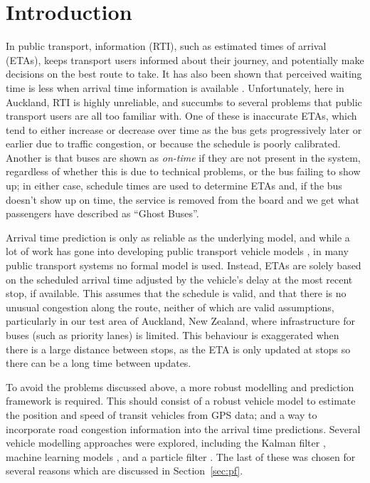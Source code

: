 \section{Introduction}
\label{sec:intro}



In public transport, \rt information (RTI), such as estimated times of arrival (ETAs),
keeps transport users informed about their journey,
and potentially make decisions on the best route to take.
It has also been shown that perceived waiting time is less
when arrival time information is available \citep{TCRP_2003b}.
Unfortunately, here in Auckland, RTI is highly unreliable,
and succumbs to several problems that public transport users
are all too familiar with.
One of these is inaccurate ETAs,
which tend to either increase or decrease over time as the bus gets progressively later or earlier
due to traffic congestion, or  because the schedule is poorly calibrated.
Another is that buses are shown as \emph{on-time} if they are not present
in the \rt system,
regardless of whether this is due to technical problems,
or the bus failing to show up;
in either case, schedule times are used to determine ETAs and, 
if the bus doesn't show up on time,
the service is removed from the \rt board 
and we get what passengers have described as ``Ghost Buses''.

Arrival time prediction is only as reliable as the underlying model,
and while a lot of work has gone into developing public transport vehicle models
\citep{Cathey_2003,Jeong_2005,Yu_2011,Hans_2015},
in many public transport systems no formal model is used.
Instead, ETAs are solely based on the scheduled arrival time
adjusted by the vehicle's delay at the most recent stop, if available.
This assumes that the schedule is valid,
and that there is no unusual congestion along the route,
neither of which are valid assumptions,
particularly in our test area of Auckland, New Zealand,
where infrastructure for buses (such as priority lanes) is limited.
This behaviour is exaggerated when there is a large distance between stops,
as the ETA is only updated at stops so there can be a long time between updates.


To avoid the problems discussed above,
a more robust modelling and prediction framework is required.
This should consist of a robust vehicle model to estimate the position and speed
of transit vehicles from \rt GPS data;
and a way to incorporate road congestion information 
into the arrival time predictions.
Several vehicle modelling approaches were explored, 
including the Kalman filter \citep{Dailey_2001,Cathey_2003},
machine learning models \citep{Yu_2006,Chang_2010},
and a particle filter \citep{Hans_2015}.
The last of these was chosen for several reasons
which are discussed in Section~\ref{sec:pf}.

